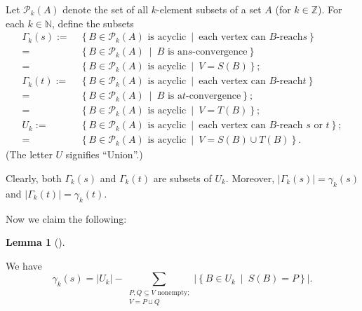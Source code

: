 \documentclass[numbers=enddot,12pt,final,onecolumn,notitlepage]{scrartcl}%
\theoremstyle{definition}
\newtheorem{lem}[theo]{Lemma}
\newenvironment{lemma}[1][]
{\begin{lem}[#1]\begin{leftbar}}
{\end{leftbar}\end{lem}}
\let\sumnonlimits\sum
\renewcommand{\sum}{\sumnonlimits\limits}
\theoremstyle{plainsl}
\begin{document}
Let $\mathcal{P}_{k}\left(  A\right)  $ denote the set of all $k$-element
subsets of a set $A$ (for $k\in\mathbb{Z}$). For each $k\in\mathbb{N}$, define
the subsets
\begin{align*}
\Gamma_{k}\left(  s\right)  :=  &  \ \left\{  B\in\mathcal{P}_{k}\left(
A\right)  \text{ is acyclic}\ \mid\ \text{each vertex can }B\text{-reach
}s\right\} \\
=  &  \ \left\{  B\in\mathcal{P}_{k}\left(  A\right)  \ \mid\ B\text{ is an
}s\text{-convergence}\right\} \\
=  &  \ \left\{  B\in\mathcal{P}_{k}\left(  A\right)  \text{ is acyclic}
\ \mid\ V=S\left(  B\right)  \right\}  ;\\
\Gamma_{k}\left(  t\right)  :=  &  \ \left\{  B\in\mathcal{P}_{k}\left(
A\right)  \text{ is acyclic}\ \mid\ \text{each vertex can }B\text{-reach
}t\right\} \\
=  &  \ \left\{  B\in\mathcal{P}_{k}\left(  A\right)  \ \mid\ B\text{ is a
}t\text{-convergence}\right\}  ;\\
=  &  \ \left\{  B\in\mathcal{P}_{k}\left(  A\right)  \text{ is acyclic}
\ \mid\ V=T\left(  B\right)  \right\}  ;\\
U_{k}:=  &  \ \left\{  B\in\mathcal{P}_{k}\left(  A\right)  \text{ is
acyclic}\ \mid\ \text{each vertex can }B\text{-reach }s\text{ or }t\right\}
;\\
=  &  \ \left\{  B\in\mathcal{P}_{k}\left(  A\right)  \text{ is acyclic}
\ \mid\ V=S\left(  B\right)  \cup T\left(  B\right)  \right\}  .
\end{align*}
(The letter $U$ signifies \textquotedblleft Union\textquotedblright.)



Clearly, both $\Gamma_{k}\left(  s\right)  $ and $\Gamma_{k}\left(  t\right)
$ are subsets of $U_{k}$. Moreover, $\left\vert \Gamma_{k}\left(  s\right)
\right\vert =\gamma_{k}\left(  s\right)  $ and $\left\vert \Gamma_{k}\left(
t\right)  \right\vert =\gamma_{k}\left(  t\right)  $.

Now we claim the following:

\begin{lemma}
\label{lem.new1} We have%
\[
\gamma_{k}\left(  s\right)  =\left\vert U_{k}\right\vert -\sum
_{\substack{P,Q\subseteq V\text{ nonempty;}\\V=P\sqcup Q}}\left\vert \left\{
B\in U_{k}\ \mid\ S\left(  B\right)  =P\right\}  \right\vert .
\]

\end{lemma}
\end{document}
